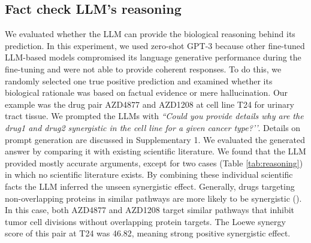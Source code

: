 {\subsection{Fact check LLM's reasoning}
We evaluated whether the LLM can provide the biological reasoning behind its prediction. In this experiment, we used zero-shot GPT-3 because other fine-tuned LLM-based models compromised its language generative performance during the fine-tuning and were not able to provide coherent responses. To do this, we randomly selected one true positive prediction and examined whether its biological rationale was based on factual evidence or mere hallucination. Our example was the drug pair AZD4877 and AZD1208 at cell line T24 for urinary tract tissue. We prompted the LLMs with \emph{``Could you provide details why are the drug1 and drug2 synergistic in the cell line for a given cancer type?’’}. Details on prompt generation are discussed in Supplementary 1.  We evaluated the generated answer by comparing it with existing scientific literature. We found that the LLM provided mostly accurate arguments, except for two cases (Table \ref{tab:reasoning}) in which no scientific literature exists. By combining these individual scientific facts the LLM inferred the unseen synergistic effect. Generally, drugs targeting non-overlapping proteins in similar pathways are more likely to be synergistic (\cite{Cheng2019-dp, Tang2022-wn}).  In  this case, both AZD4877 and AZD1208 target similar pathways that inhibit tumor cell divisions without overlapping protein targets. The Loewe synergy score of this pair at T24 was 46.82, meaning strong positive synergistic effect.


}
